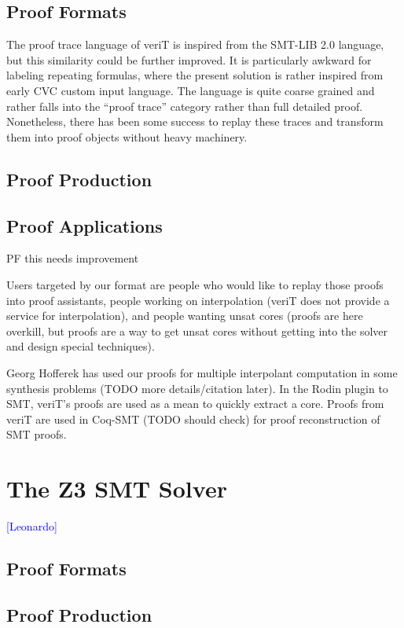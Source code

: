 \documentclass{llncs}
\newcommand{\Note}[1]{\textcolor{blue}{[#1]}}
\begin{document}
\subsection{Proof Formats}

The proof trace language of veriT is inspired from the SMT-LIB 2.0 language, but this similarity could be further improved.  It is particularly awkward for labeling repeating formulas, where the present solution is rather inspired from early CVC custom input language.  The language is quite coarse grained and rather falls into the ``proof trace'' category rather than full detailed proof.  Nonetheless, there has been some success to replay these traces and transform them into proof objects without heavy machinery.


\subsection{Proof Production}
\subsection{Proof Applications}

PF this needs improvement

Users targeted by our format are people who would like to replay those proofs into proof assistants, people working on interpolation (veriT does not provide a service for interpolation), and people wanting unsat cores (proofs are here overkill, but proofs are a way to get unsat cores without getting into the solver and design special techniques).

Georg Hofferek has used our proofs for multiple interpolant computation in some synthesis problems (TODO more details/citation later).  In the Rodin plugin to SMT, veriT's proofs are used as a mean to quickly extract a core.  Proofs from veriT are used in Coq-SMT (TODO should check) for proof reconstruction of SMT proofs.

\section{The Z3 SMT Solver}
\Note{Leonardo}
\subsection{Proof Formats}
\subsection{Proof Production}
\end{document}
